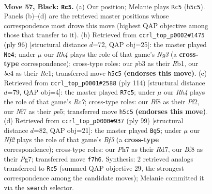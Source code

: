 \documentclass[11pt]{article}
\begin{document}
\clearpage

\begin{figure}[p]\centering
\begin{subfigure}{0.46\textwidth}\centering
\resizebox{\linewidth}{!}{%
\newchessgame
\chessboard[
  setfen={5b1r/p4nkp/P7/7r/2B2B2/1Pp3KP/R1P3P1/4R3 b - - 22 57},
  showmover=false,
  pgfstyle=straightmove, color=movearrow, markmove={h5-c5}
]}
\caption{}
\end{subfigure}\hfill
\begin{subfigure}{0.46\textwidth}\centering
\resizebox{\linewidth}{!}{%
\newchessgame
\chessboard[
  setfen={8/5pk1/4bbp1/r6p/8/6NP/5PP1/1R2R1K1 w - - 20 49},
  showmover=false,
  pgfstyle=straightmove, color=movearrow, markmove={g3-e4}
]}
\caption{}
\end{subfigure}
\\[4pt]
\begin{subfigure}{0.46\textwidth}\centering
\resizebox{\linewidth}{!}{%
\newchessgame
\chessboard[
  setfen={4r3/2Rr2p1/pB3k1p/Pb2p3/8/7P/5PPK/2R5 w - - 48 58},
  showmover=false,
  pgfstyle=straightmove, color=movearrow, markmove={c7-c5}
]}
\caption{}
\end{subfigure}\hfill
\begin{subfigure}{0.46\textwidth}\centering
\resizebox{\linewidth}{!}{%
\newchessgame
\chessboard[
  setfen={4R3/1p1r2p1/pB3bk1/P2r4/5RP1/5K2/5P2/8 b - - 10 50},
  showmover=false,
  pgfstyle=straightmove, color=movearrow, markmove={f6-g5}
]}
\caption{}
\end{subfigure}
\caption{\textbf{Move 57, Black: \texttt{Rc5}.} (a) Our position; Melanie plays \texttt{Rc5} (\texttt{h5c5}). Panels (b)--(d) are the retrieved master positions whose correspondence most drove this move (highest QAP objective among those that transfer to it). (b) Retrieved from \texttt{ccrl\_top\_p0002\#1475} (ply 96) [structural distance $d$=72, QAP obj=25]: the master played \texttt{Ne4}; under $\mu$ our \emph{Rh4} plays the role of that game's \emph{Ng3} (a \textbf{cross-type} correspondence); cross-type roles: our \emph{p}b3 as their \emph{R}b1, our \emph{b}c4 as their \emph{R}e1; transferred move \texttt{h5c5} \textbf{(endorses this move)}. (c) Retrieved from \texttt{ccrl\_top\_p0001\#2588} (ply 114) [structural distance $d$=79, QAP obj=4]: the master played \texttt{R7c5}; under $\mu$ our \emph{Rh4} plays the role of that game's \emph{Rc7}; cross-type roles: our \emph{B}f8 as their \emph{P}f2, our \emph{N}f7 as their \emph{p}e5; transferred move \texttt{h5c5} \textbf{(endorses this move)}. (d) Retrieved from \texttt{ccrl\_top\_p0000\#937} (ply 99) [structural distance $d$=82, QAP obj=21]: the master played \texttt{Bg5}; under $\mu$ our \emph{Nf2} plays the role of that game's \emph{Bf3} (a \textbf{cross-type} correspondence); cross-type roles: our \emph{P}h7 as their \emph{R}d7, our \emph{B}f8 as their \emph{P}g7; transferred move \texttt{f7h6}. Synthesis: 2 retrieved analogs transferred to \texttt{Rc5} (summed QAP objective 29, the strongest correspondence among the candidate moves); Melanie committed it via the \texttt{search} selector.}
\label{fig:thought-m113}
\end{figure}
\end{document}
